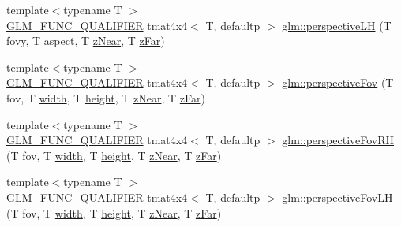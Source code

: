 \begin{DoxyCompactItemize}
\item 
{\footnotesize template$<$typename T $>$ }\\\mbox{\hyperlink{setup_8hpp_a33fdea6f91c5f834105f7415e2a64407}{G\+L\+M\+\_\+\+F\+U\+N\+C\+\_\+\+Q\+U\+A\+L\+I\+F\+I\+ER}} tmat4x4$<$ T, defaultp $>$ \mbox{\hyperlink{group__gtc__matrix__transform_ga34048da27c559f1ac8e9550d169dd6f3}{glm\+::perspective\+LH}} (T fovy, T aspect, T \mbox{\hyperlink{glad_8h_a48b62672ab8e9fe8f51a25e62e7bc888}{z\+Near}}, T \mbox{\hyperlink{glad_8h_a7f9438456c002a9d045c5e4c3b6a9cbb}{z\+Far}})
\item 
{\footnotesize template$<$typename T $>$ }\\\mbox{\hyperlink{setup_8hpp_a33fdea6f91c5f834105f7415e2a64407}{G\+L\+M\+\_\+\+F\+U\+N\+C\+\_\+\+Q\+U\+A\+L\+I\+F\+I\+ER}} tmat4x4$<$ T, defaultp $>$ \mbox{\hyperlink{group__gtc__matrix__transform_gae9146e2c550fc8646299e4b900238145}{glm\+::perspective\+Fov}} (T fov, T \mbox{\hyperlink{glad_8h_a09012ea95ebbbe1c032db7c68b54291e}{width}}, T \mbox{\hyperlink{glad_8h_a456943498a720df0f4b62bafa5dad93c}{height}}, T \mbox{\hyperlink{glad_8h_a48b62672ab8e9fe8f51a25e62e7bc888}{z\+Near}}, T \mbox{\hyperlink{glad_8h_a7f9438456c002a9d045c5e4c3b6a9cbb}{z\+Far}})
\item 
{\footnotesize template$<$typename T $>$ }\\\mbox{\hyperlink{setup_8hpp_a33fdea6f91c5f834105f7415e2a64407}{G\+L\+M\+\_\+\+F\+U\+N\+C\+\_\+\+Q\+U\+A\+L\+I\+F\+I\+ER}} tmat4x4$<$ T, defaultp $>$ \mbox{\hyperlink{group__gtc__matrix__transform_ga07cd8df791bf90dcb782645fe0b21261}{glm\+::perspective\+Fov\+RH}} (T fov, T \mbox{\hyperlink{glad_8h_a09012ea95ebbbe1c032db7c68b54291e}{width}}, T \mbox{\hyperlink{glad_8h_a456943498a720df0f4b62bafa5dad93c}{height}}, T \mbox{\hyperlink{glad_8h_a48b62672ab8e9fe8f51a25e62e7bc888}{z\+Near}}, T \mbox{\hyperlink{glad_8h_a7f9438456c002a9d045c5e4c3b6a9cbb}{z\+Far}})
\item 
{\footnotesize template$<$typename T $>$ }\\\mbox{\hyperlink{setup_8hpp_a33fdea6f91c5f834105f7415e2a64407}{G\+L\+M\+\_\+\+F\+U\+N\+C\+\_\+\+Q\+U\+A\+L\+I\+F\+I\+ER}} tmat4x4$<$ T, defaultp $>$ \mbox{\hyperlink{group__gtc__matrix__transform_gae705a2f19c3ef5ef880bd6c92759cf2d}{glm\+::perspective\+Fov\+LH}} (T fov, T \mbox{\hyperlink{glad_8h_a09012ea95ebbbe1c032db7c68b54291e}{width}}, T \mbox{\hyperlink{glad_8h_a456943498a720df0f4b62bafa5dad93c}{height}}, T \mbox{\hyperlink{glad_8h_a48b62672ab8e9fe8f51a25e62e7bc888}{z\+Near}}, T \mbox{\hyperlink{glad_8h_a7f9438456c002a9d045c5e4c3b6a9cbb}{z\+Far}})

\end{DoxyCompactItemize}
